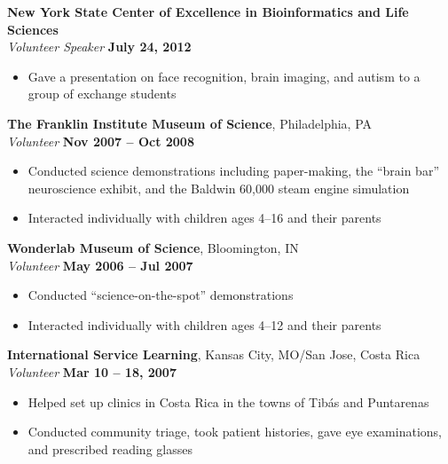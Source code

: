 \documentclass{article}
\begin{document}
{\bf New York State Center of Excellence in Bioinformatics and Life Sciences} \\
 {\it Volunteer Speaker} \hfill {\bf July 24, 2012}
 \begin{itemize} \itemsep -2pt
  \item Gave a presentation on face recognition, brain imaging, and autism to a group of exchange students
 \end{itemize}

{\bf The Franklin Institute Museum of Science}, Philadelphia, PA\\
{\it Volunteer} \hfill {\bf Nov 2007 -- Oct 2008}
 \begin{itemize} \itemsep -2pt
  \item Conducted science demonstrations including paper-making, the ``brain bar'' neuroscience exhibit, and the Baldwin 60,000 steam engine simulation
  \item Interacted individually with children ages 4--16 and their parents
 \end{itemize}

{\bf Wonderlab Museum of Science}, Bloomington, IN\\
{\it Volunteer} \hfill {\bf May 2006 -- Jul 2007}
 \begin{itemize} \itemsep -2pt
  \item Conducted ``science-on-the-spot'' demonstrations
  \item Interacted individually with children ages 4--12 and their parents
 \end{itemize}

{\bf International Service Learning}, Kansas City, MO/San Jose, Costa Rica\\
{\it Volunteer} \hfill {\bf Mar 10 -- 18, 2007}
 \begin{itemize} \itemsep -2pt
  \item Helped set up clinics in Costa Rica in the towns of Tib\'{a}s and Puntarenas
  \item Conducted community triage, took patient histories, gave eye examinations, and prescribed reading glasses
 \end{itemize}
\end{document}
